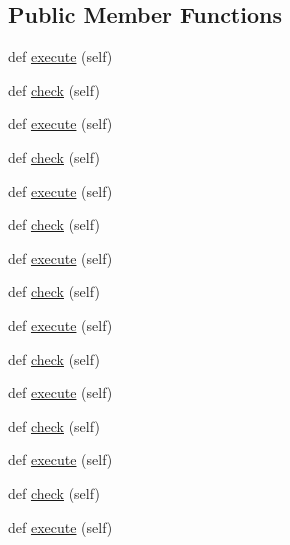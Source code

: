 \subsection*{Public Member Functions}
\begin{DoxyCompactItemize}
\item 
def \hyperlink{classwaflib_1_1_scripting_1_1_dist_check_a9ec9b4a7944fbc0bef5ed200a6c67a32}{execute} (self)
\item 
def \hyperlink{classwaflib_1_1_scripting_1_1_dist_check_a5c7d7e7e99c2634c0792bb99a4f2ba7d}{check} (self)
\item 
def \hyperlink{classwaflib_1_1_scripting_1_1_dist_check_a9ec9b4a7944fbc0bef5ed200a6c67a32}{execute} (self)
\item 
def \hyperlink{classwaflib_1_1_scripting_1_1_dist_check_a5c7d7e7e99c2634c0792bb99a4f2ba7d}{check} (self)
\item 
def \hyperlink{classwaflib_1_1_scripting_1_1_dist_check_a9ec9b4a7944fbc0bef5ed200a6c67a32}{execute} (self)
\item 
def \hyperlink{classwaflib_1_1_scripting_1_1_dist_check_a5c7d7e7e99c2634c0792bb99a4f2ba7d}{check} (self)
\item 
def \hyperlink{classwaflib_1_1_scripting_1_1_dist_check_a9ec9b4a7944fbc0bef5ed200a6c67a32}{execute} (self)
\item 
def \hyperlink{classwaflib_1_1_scripting_1_1_dist_check_a5c7d7e7e99c2634c0792bb99a4f2ba7d}{check} (self)
\item 
def \hyperlink{classwaflib_1_1_scripting_1_1_dist_check_a9ec9b4a7944fbc0bef5ed200a6c67a32}{execute} (self)
\item 
def \hyperlink{classwaflib_1_1_scripting_1_1_dist_check_a5c7d7e7e99c2634c0792bb99a4f2ba7d}{check} (self)
\item 
def \hyperlink{classwaflib_1_1_scripting_1_1_dist_check_a9ec9b4a7944fbc0bef5ed200a6c67a32}{execute} (self)
\item 
def \hyperlink{classwaflib_1_1_scripting_1_1_dist_check_a5c7d7e7e99c2634c0792bb99a4f2ba7d}{check} (self)
\item 
def \hyperlink{classwaflib_1_1_scripting_1_1_dist_check_a9ec9b4a7944fbc0bef5ed200a6c67a32}{execute} (self)
\item 
def \hyperlink{classwaflib_1_1_scripting_1_1_dist_check_a5c7d7e7e99c2634c0792bb99a4f2ba7d}{check} (self)
\item 
def \hyperlink{classwaflib_1_1_scripting_1_1_dist_check_a9ec9b4a7944fbc0bef5ed200a6c67a32}{execute} (self)
\item 

\end{DoxyCompactItemize}
